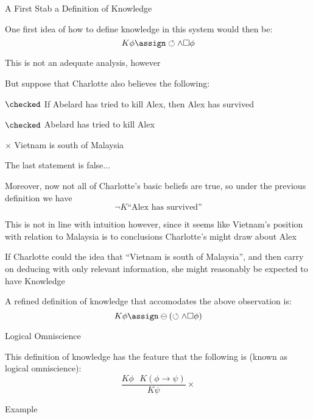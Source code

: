A First Stab a Definition of Knowledge
\begin{itemizedot}
  \item One first idea of how to define knowledge in this system would then
  be:
  \[ K \phi \assign \circlearrowleft \wedge \Box  \phi \]
  \item This is not an adequate analysis, however
\end{itemizedot}
\begin{itemizedot}
  \item But suppose that Charlotte also believes the following:
  
  \begin{descriptiondash}
    \item[$\checked$] If Abelard has tried to kill Alex, then Alex has
    survived
    
    \item[$\checked$] Abelard has tried to kill Alex
    
    \item[$\times$] Vietnam is south of Malaysia
  \end{descriptiondash}
  
  \item The last statement is false$\ldots$
  
  \item Moreover, now not all of Charlotte's basic beliefs are true, so under
  the previous definition we have
  \[ \neg K \text{``Alex has survived''} \]
\end{itemizedot}

\begin{itemizedot}
  \item This is not in line with intuition however, since it seems like
  Vietnam's position with relation to Malaysia is {} to
  conclusions Charlotte's might draw about Alex
  
  \item If Charlotte could {} the idea that ``Vietnam is
  south of Malaysia'', and then carry on deducing with only relevant
  information, she might reasonably be expected to have Knowledge
  
  \item A refined definition of knowledge that accomodates the above
  observation is:
  \[ K \phi \assign \ominus (\circlearrowleft \wedge \Box  \phi) \]
\end{itemizedot}
Logical Omniscience
\begin{itemizedot}
  \item This definition of knowledge has the feature that the following is
   (known as logical omniscience):
  \[ \frac{K \phi \text{ \ \ \ } K (\phi \rightarrow \psi)}{K \psi} \times \]
\end{itemizedot}
Example


